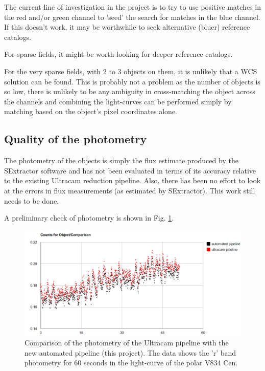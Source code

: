 \documentclass[a4paper,10pt]{article}
\begin{document}
The current line of investigation in the project is to try to use positive matches in the red and/or green channel to 'seed' the search for matches in the blue channel. If this doesn't work, it may be worthwhile to seek alternative (bluer) reference catalogs. 

For sparse fields, it might be worth looking for deeper reference catalogs. 

For the very sparse fields, with 2 to 3 objects on them, it is unlikely that a WCS solution can be found. This is probably not a problem as the number of objects is so low, there is unlikely to be any ambiguity in cross-matching the object across the channels and combining the light-curves can be performed simply by matching based on the object's pixel coordinates alone.  


\subsection{Quality of the photometry}
The photometry of the objects is simply the flux estimate produced by the SExtractor software and has not been evaluated in terms of its accuracy relative to the existing Ultracam reduction pipeline. Also, there has been no effort to look at the errors in flux measurements (as estimated by SExtractor). This work still needs to be done. 

A preliminary check of photometry is shown in Fig. \ref{fig:V834Cen}. 

\begin{figure}[!h]
	\centering
	\includegraphics[width=120mm]{images/V834Cen.png}
	\caption{Comparison of the photometry of the Ultracam pipeline with the new automated pipeline (this project). The data shows the 'r' band photometry for 60 seconds in the light-curve of the polar V834 Cen.}
	\label{fig:V834Cen}
\end{figure}
\end{document}
